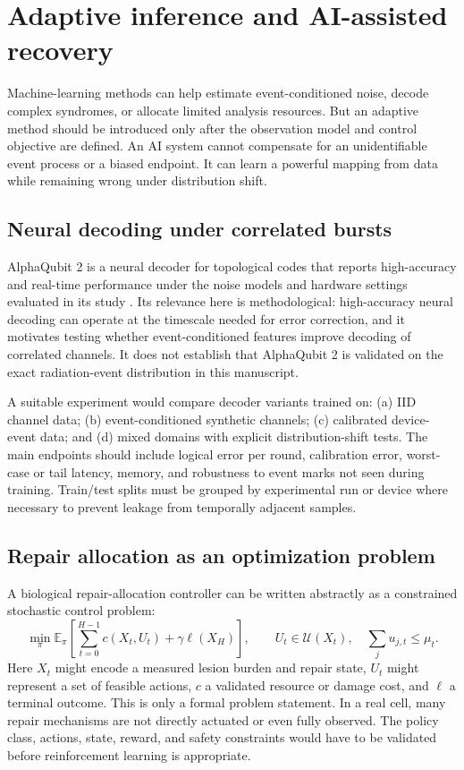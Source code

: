 \documentclass[11pt,a4paper,oneside]{article}
\newcommand{\E}{\mathbb{E}}\newcommand{\Pp}{\mathbb{P}}\newcommand{\R}{\mathbb{R}}\newcommand{\N}{\mathbb{N}}\newcommand{\cX}{\mathcal{X}}\newcommand{\cE}{\mathcal{E}}\newcommand{\cF}{\mathcal{F}}\newcommand{\cS}{\mathcal{S}}\newcommand{\cD}{\mathcal{D}}\newcommand{\cR}{\mathcal{R}}\newcommand{\cC}{\mathcal{C}}\newcommand{\cL}{\mathcal{L}}\newcommand{\cN}{\mathcal{N}}\newcommand{\dd}{\,\mathrm{d}}\newcommand{\Prob}{\mathrm{Pr}}\newcommand{\Var}{\mathrm{Var}}\newcommand{\Cov}{\mathrm{Cov}}\newcommand{\diag}{\mathrm{diag}}\newcommand{\tr}{\mathrm{tr}}\newcommand{\argmin}{\operatorname*{arg\,min}}\newcommand{\argmax}{\operatorname*{arg\,max}}
\begin{document}
\section{Adaptive inference and AI-assisted recovery}
\label{sec:ai}
Machine-learning methods can help estimate event-conditioned noise, decode complex syndromes, or allocate limited analysis resources. But an adaptive method should be introduced only after the observation model and control objective are defined. An AI system cannot compensate for an unidentifiable event process or a biased endpoint. It can learn a powerful mapping from data while remaining wrong under distribution shift.

\subsection{Neural decoding under correlated bursts}
AlphaQubit 2 is a neural decoder for topological codes that reports high-accuracy and real-time performance under the noise models and hardware settings evaluated in its study \citep{Senior2025}. Its relevance here is methodological: high-accuracy neural decoding can operate at the timescale needed for error correction, and it motivates testing whether event-conditioned features improve decoding of correlated channels. It does not establish that AlphaQubit 2 is validated on the exact radiation-event distribution in this manuscript.

A suitable experiment would compare decoder variants trained on: (a) IID channel data; (b) event-conditioned synthetic channels; (c) calibrated device-event data; and (d) mixed domains with explicit distribution-shift tests. The main endpoints should include logical error per round, calibration error, worst-case or tail latency, memory, and robustness to event marks not seen during training. Train/test splits must be grouped by experimental run or device where necessary to prevent leakage from temporally adjacent samples.

\subsection{Repair allocation as an optimization problem}
A biological repair-allocation controller can be written abstractly as a constrained stochastic control problem:
\begin{equation}\label{eq:repair-mdp}
\min_{\pi}\E_{\pi}\left[\sum_{t=0}^{H-1}c(X_t,U_t)+\gamma\ell(X_H)\right],\qquad U_t\in\mathcal{U}(X_t),\quad \sum_j u_{j,t}\le\mu_t.
\end{equation}
Here \(X_t\) might encode a measured lesion burden and repair state, \(U_t\) might represent a set of feasible actions, \(c\) a validated resource or damage cost, and \(\ell\) a terminal outcome. This is only a formal problem statement. In a real cell, many repair mechanisms are not directly actuated or even fully observed. The policy class, actions, state, reward, and safety constraints would have to be validated before reinforcement learning is appropriate.
\end{document}

